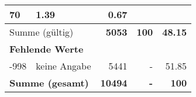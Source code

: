 \begin{longtable}{lXrrr}
       \num{70} &
       \num[round-mode=places,round-precision=2]{1.39} &
         \num[round-mode=places,round-precision=2]{0.67} \\
     \midrule
     \multicolumn{2}{l}{Summe (gültig)} &
       \textbf{\num{5053}} &
     \textbf{\num{100}} &
       \textbf{\num[round-mode=places,round-precision=2]{48.15}} \\
     \multicolumn{5}{l}{\textbf{Fehlende Werte}}\\
       -998 &
       keine Angabe &
         \num{5441} &
        - &
         \num[round-mode=places,round-precision=2]{51.85} \\
     \midrule
     \multicolumn{2}{l}{\textbf{Summe (gesamt)}} &
          \textbf{\num{10494}} &
        \textbf{-} &
        \textbf{\num{100}} \\
     \bottomrule
     \end{longtable}
     
